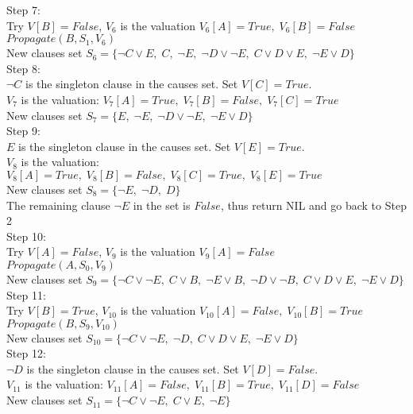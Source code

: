 \documentclass{article}
\begin{document}
\begin{description}
Step 7:\\
Try $V[B]=False$, $V_{6}$ is the valuation $V_{6}[A]=True,\; V_{6}[B]=False$\\
$Propagate(B,S_{1},V_{6})$\\
New clauses set $ S_{6}=\{ \neg C\vee E,\; C,\; \neg E,\; \neg D\vee \neg E, \; C\vee D\vee E ,\; \neg E\vee D \} $\\

Step 8:\\
$ \neg C $ is the singleton clause in the causes set. Set $V[C]=True$.\\
$V_{7}$ is the valuation: $ V_{7}[A]=True,\; V_{7}[B]=False,\;  V_{7}[C]=True $\\
New clauses set $ S_{7}= \{ E,\; \neg E,\; \neg D\vee \neg E, \; \neg E\vee D\} $\\

Step 9:\\
$ E $ is the singleton clause in the causes set. Set $V[E]=True$.\\
$V_{8}$ is the valuation: $ V_{8}[A]=True,\; V_{8}[B]=False,\;  V_{8}[C]=True,\; V_{8}[E]=True $\\
New clauses set $ S_{8}= \{  \neg E,\; \neg D, \; D\} $\\
The remaining clause $\neg E$ in the set is $False$, thus return NIL and go back to Step 2\\

Step 10:\\
Try $V[A]=False$, $V_{9}$ is the valuation $V_{9}[A]=False$\\
$Propagate(A,S_{0},V_{9})$\\
New clauses set $S_{9}=\{\neg C \vee \neg E,\; C\vee B,\; \neg E \vee B,\; \neg D\vee \neg B,\; C\vee D\vee E ,\; \neg E\vee D\}$ \\

Step 11:\\
Try $ V[B]=True $, $V_{10}$ is the valuation $V_{10}[A]=False,\; V_{10}[B]=True $\\
$Propagate(B,S_{9},V_{10})$\\
New clauses set $S_{10}=\{\neg C \vee \neg E,\;\neg D,\; C\vee D\vee E ,\; \neg E\vee D\}$ \\

Step 12:\\
$ \neg D $ is the singleton clause in the causes set. Set $V[D]=False$.\\
$V_{11}$ is the valuation: $ V_{11}[A]=False,\; V_{11}[B]=True,\; V_{11}[D]=False $\\
New clauses set $ S_{11}=\{ \neg C \vee \neg E,\; C\vee E,\; \neg E \} $\\


\end{description}
\end{document}
